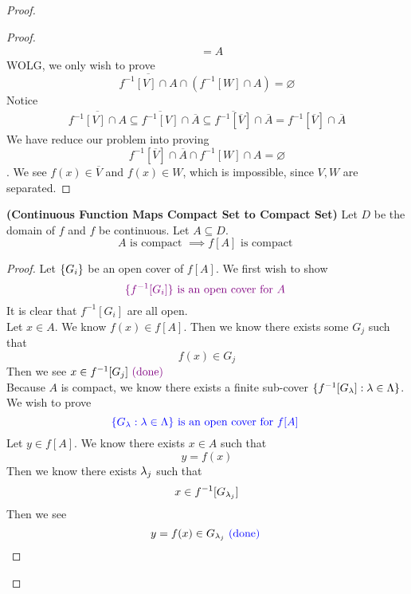 \documentclass{report}
\begin{document}
\begin{proof}
\begin{proof}
\begin{align*}
  &=A
\end{align*}
WOLG, we only wish to prove
\begin{equation*}
\overline{f^{-1}[V]\cap A}\cap (f^{-1}[W]\cap A)=\varnothing
\end{equation*}
Notice
\begin{align*}
  \overline{f^{-1}[V]\cap A}\subseteq \overline{f^{-1}[V]}\cap \overline{A}\subseteq \overline{f^{-1}[\overline{V}]}\cap \overline{A}=f^{-1}[\overline{V}]\cap \overline{A}
\end{align*}
We have reduce our problem into proving 
\begin{equation*}
f^{-1}[\overline{V}]\cap \overline{A}\cap f^{-1}[W]\cap A=\varnothing
\end{equation*}
. We see $f(x)\in \overline{V}$ and $f(x)\in W$, which is impossible, since $V,W$ are separated.  \CaC
\end{proof}
\begin{theorem}
\label{2.4.7}
\textbf{(Continuous Function Maps Compact Set to Compact Set)} Let $D$ be the domain of $f$ and $f$ be continuous. Let $A\subseteq D$.
\begin{equation*}
A\text{ is compact }\implies f[A]\text{ is compact }
\end{equation*}
\end{theorem}
\begin{proof}
Let $\{ G_i \}$ be an open cover of $f[A]$. We first wish to show
\begin{equation*}
  \textcolor{violet}{\{ f^{-1}[G_i] \}\text{ is an open cover for $A$ }}
\end{equation*}
It is clear that $f^{-1}[G_i]$ are all open.\\

Let $x\in A$. We know $f(x)\in f[A]$. Then we know there exists some $G_j$ such that 
 \begin{equation*}
f(x)\in G_j
\end{equation*}
Then we see $x\in f^{-1}[G_j]\textcolor{violet}{\text{ (done) }}$\\

Because $A$ is compact, we know there exists a finite sub-cover  $\{ f^{-1}[G_\lambda] :\lambda  \in \Lambda  \}$.\\

We wish to prove
\begin{equation*}
\textcolor{blue}{\{ G_\lambda :\lambda \in \Lambda  \}\text{ is an open cover for $f[A]$ }}
\end{equation*}
Let $y\in f[A]$. We know there exists $x\in A$ such that 
\begin{equation*}
y=f(x)
\end{equation*}
Then we know there exists  $\lambda _j$ such that
\begin{equation*}
x\in f^{-1}[G_{\lambda _j}]
\end{equation*}
Then we see 
\begin{equation*}
y=f(x)\in G_{\lambda _j}\textcolor{blue}{\text{ (done) }}
\end{equation*}
\end{proof}

\end{proof}
\end{document}
